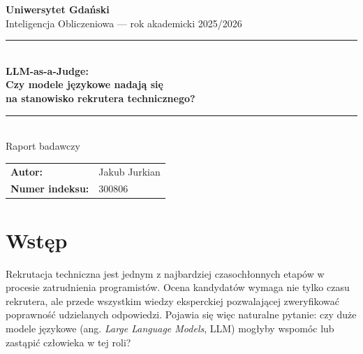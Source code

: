 \documentclass[12pt, a4paper]{article}
\begin{document}
\begin{titlepage}
    \begin{center}
        \vspace*{1cm}
        {\Large\bfseries Uniwersytet Gdański\\
        [0.3cm]}
        {\normalsize Inteligencja Obliczeniowa — rok akademicki 2025/2026\\[2cm]}

        \rule{\linewidth}{0.5mm}\\[0.4cm]
        {\LARGE\bfseries LLM-as-a-Judge:\\[0.3cm]
        Czy modele językowe nadają się\\
        na stanowisko rekrutera technicznego?}\\[0.4cm]
        \rule{\linewidth}{0.5mm}\\[2cm]

        {\large Raport badawczy}\\[3cm]

        \begin{tabular}{ll}
            \textbf{Autor:}          & Jakub Jurkian \\[0.3cm]
            \textbf{Numer indeksu:}  & 300806 \\[0.3cm]
        \end{tabular}
    \end{center}

    \vfill
\end{titlepage}

\tableofcontents
\newpage

\section{Wstęp}

Rekrutacja techniczna jest jednym z najbardziej czasochłonnych etapów w procesie zatrudnienia
programistów. Ocena kandydatów wymaga nie tylko czasu rekrutera, ale przede wszystkim
wiedzy eksperckiej pozwalającej zweryfikować poprawność udzielanych odpowiedzi.
Pojawia się więc naturalne pytanie: czy duże modele językowe (ang. \textit{Large Language Models},
LLM) mogłyby wspomóc lub zastąpić człowieka w tej roli?
\end{document}
